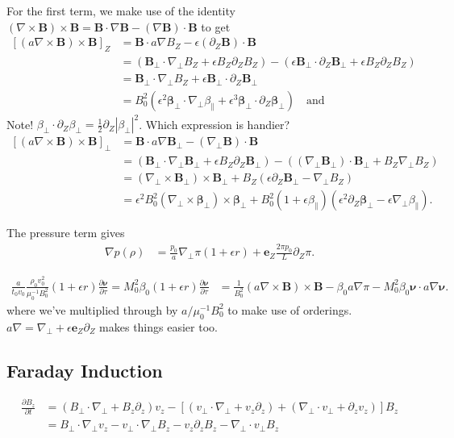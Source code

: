 \documentclass{article}
\newcommand{\para}{\parallel}
\newcommand{\ep}{\epsilon}
\newcommand{\np}{\nabla_\perp}
\newcommand{\p}{\partial}
\newcommand{\deriv}[2]{\frac{\p #1}{\p #2}}
\newcommand{\pth} [1] {\left( #1 \right) }
\newcommand{\br} [1] {\left[ #1 \right] }
\begin{document}
For the first term, we make use of the identity $\pth{\nabla\times\bm{B}}\times\bm{B} = \bm{B}\cdot\nabla\bm{B} - \pth{\nabla\bm{B}}\cdot\bm{B}$ to get 
\begin{align*}
    \br{\pth{a\nabla\times\bm{B}}\times\bm{B}}_Z &= \bm{B}\cdot a\nabla B_Z - \ep\pth{\p_Z\bm{B}}\cdot\bm{B} \\ 
    &= \pth{\bm{B}_\perp\cdot\np B_Z + \ep B_Z\p_Z B_Z} - \pth{\ep\bm{B}_\perp\cdot\p_Z\bm{B}_\perp + \ep B_Z\p_ZB_Z} \\ 
    &= \bm{B}_\perp\cdot \np B_Z + \ep\bm{B}_\perp\cdot \p_Z\bm{B}_\perp \\ 
    &= B_0^2 \pth{\ep^2\bm{\beta}_\perp\cdot\np\beta_\para + \ep^3 \bm{\beta}_\perp\cdot\p_Z\bm{\beta}_\perp}  \quad\text{and}
\end{align*}
Note! $\beta_\perp\cdot\p_Z\beta_\perp = \frac{1}{2}\p_Z|\beta_\perp|^2$. Which expression is handier? 
\begin{align*}
    \br{\pth{a\nabla\times\bm{B}}\times\bm{B}}_\perp &= \bm{B}\cdot a\nabla\bm{B}_\perp - \pth{\np\bm{B}}\cdot\bm{B} \\ 
    &= \pth{\bm{B}_\perp\cdot\np\bm{B}_\perp + \ep B_Z\p_Z\bm{B}_\perp} - \pth{\pth{\np\bm{B}_\perp} \cdot\bm{B}_\perp + B_Z\np B_Z} \\ 
    &= \pth{\np\times\bm{B}_\perp}\times\bm{B}_\perp + B_Z\pth{\ep\p_Z\bm{B}_\perp - \np B_Z} \\ 
    &= \ep^2 B_0^2 \pth{\np\times\bm{\beta}_\perp}\times\bm{\beta}_\perp + B_0^2 \pth{1+\ep\beta_\para} \pth{\ep^2\p_Z\bm{\beta}_\perp - \ep\np\beta_\para}. 
\end{align*}

The pressure term gives 
\begin{align*}
    \nabla p\pth{\rho} &= \frac{p_0}{a}\np\pi\pth{1+\ep r} + \bm{e}_Z \frac{2\pi p_0}{L}\p_Z\pi.
\end{align*}

\begin{align*}
    \frac{a}{t_0v_0}\frac{\rho_0v_0^2}{\mu_0^{-1}B_0^2} \pth{1+\ep r} \deriv{\bm{\nu}}{\tau} = M_0^2\beta_0 \pth{1+\ep r} \deriv{\bm{\nu}}{\tau} &= \frac{1}{B_0^2} \pth{a\nabla\times\bm{B}}\times\bm{B} - \beta_0 a\nabla\pi - M_0^2\beta_0 \bm{\nu}\cdot a\nabla\bm{\nu}. 
\end{align*}
where we've multiplied through by $a/\mu_0^{-1}B_0^2$ to make use of orderings. $a\nabla = \np + \ep\bm{e}_Z\p_Z$ makes things easier too. 



\subsection{Faraday Induction}
\begin{align*} 
\deriv{B_z}{t} &= 
    \pth{B_\perp\cdot\np + B_z\p_z}v_z - \br{(v_\perp\cdot\np + v_z\p_z) + (\np\cdot v_\perp + \p_zv_z)} B_z \\
    &= B_\perp\cdot\np v_z - v_\perp\cdot\np B_z - v_z\p_zB_z - \np \cdot v_\perp B_z 
\end{align*}
\end{document}
